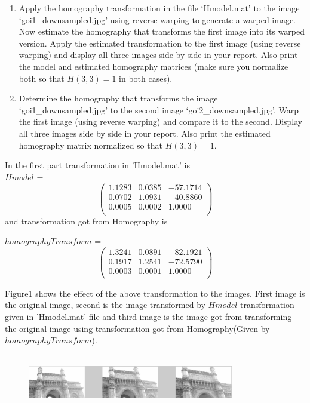 \documentclass[a4paper,10pt]{article}
\begin{document}
\begin{enumerate}
\item Apply the homography transformation in the file `Hmodel.mat' to the image `goi1\_downsampled.jpg' using
reverse warping to generate a warped image. Now estimate the homography that transforms the first image into 
its warped version. Apply the estimated transformation to the first image (using reverse warping) and display 
all three images side by side in your report. Also print the model and estimated homography matrices (make sure
you normalize both so that $H(3,3) = 1$ in both cases). 
\item Determine the homography that transforms the image `goi1\_downsampled.jpg' to the second image
`goi2\_downsampled.jpg'. Warp the first image (using reverse warping) and compare it to the second. Display all 
three images side by side in your report. Also print the estimated homography matrix normalized so that 
$H(3,3) = 1$. 
\end{enumerate}

In the first part transformation in 'Hmodel.mat' is \\
$Hmodel$ = \[ \left( \begin{array}{cccc}
    1.1283 &  0.0385 & -57.1714\\
    0.0702 &  1.0931 & -40.8860\\
    0.0005 &  0.0002 &  1.0000\\
              \end{array} \right)\]
and transformation got from Homography is

$homographyTransform$ = \[ \left( \begin{array}{cccc}
    1.3241 &  0.0891 & -82.1921\\
    0.1917 &  1.2541 & -72.5790\\
    0.0003 &  0.0001 &  1.0000\\
              \end{array} \right)\]
            
            
Figure1 shows the effect of the above transformation to the images. First image is the original image,
second is the image transformed by $Hmodel$ transformation given in 'Hmodel.mat' file and third image is the image 
got from transforming the original image using transformation got from Homography(Given by $homographyTransform$).
\\
\\
\begin{figure}[ht!]
\centering
\includegraphics[width=90mm]{figure1.png}
\caption{}
\end{figure}
\end{document}
